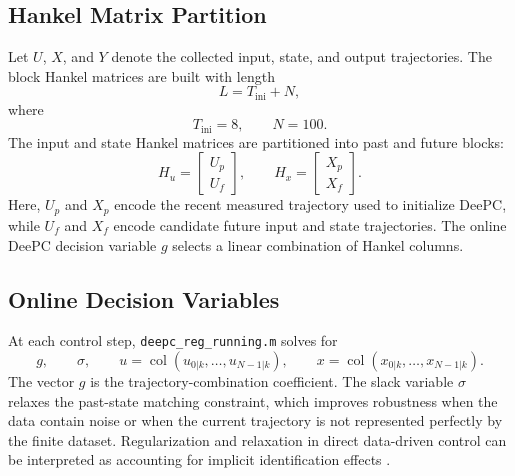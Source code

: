 \documentclass[conference]{IEEEtran}
\begin{document}
\subsection{Hankel Matrix Partition}
Let $U$, $X$, and $Y$ denote the collected input, state, and output trajectories. The block Hankel matrices are built with length
\[
L=T_{\mathrm{ini}}+N,
\]
where
\[
T_{\mathrm{ini}}=8,\qquad N=100.
\]
The input and state Hankel matrices are partitioned into past and future blocks:
\[
H_u =
\begin{bmatrix}
U_p\\
U_f
\end{bmatrix},
\qquad
H_x =
\begin{bmatrix}
X_p\\
X_f
\end{bmatrix}.
\]
Here, $U_p$ and $X_p$ encode the recent measured trajectory used to initialize DeePC, while $U_f$ and $X_f$ encode candidate future input and state trajectories. The online DeePC decision variable $g$ selects a linear combination of Hankel columns.

\subsection{Online Decision Variables}
At each control step, \texttt{deepc\_reg\_running.m} solves for
\[
g,\qquad
\sigma,\qquad
u=
\operatorname{col}(u_{0|k},\ldots,u_{N-1|k}),
\qquad
x=
\operatorname{col}(x_{0|k},\ldots,x_{N-1|k}).
\]
The vector $g$ is the trajectory-combination coefficient. The slack variable $\sigma$ relaxes the past-state matching constraint, which improves robustness when the data contain noise or when the current trajectory is not represented perfectly by the finite dataset. Regularization and relaxation in direct data-driven control can be interpreted as accounting for implicit identification effects \cite{dorfler2023bridging}.
\end{document}
